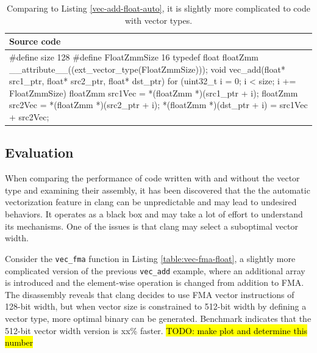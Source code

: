 \documentclass[logo,bsc,singlespacing,parskip]{infthesis}
\newenvironment{VerbatimCompact}
  {\vspace*{-2.5mm}\VerbatimEnvironment
   \par\Verbatim}
  {\endVerbatim\vspace*{-2.4mm}}
\begin{document}
\begin{table}[ht]\captionsetup{name=Listing}
\captionsetup{justification=centering}
\begin{tabular}{>{\raggedright\arraybackslash}p{14cm}}
    Source code\\
    \midrule
    \begin{VerbatimCompact}
#define size 128
#define FloatZmmSize 16
typedef float floatZmm __attribute__((ext_vector_type(FloatZmmSize)));
void vec_add(float* src1_ptr, float* src2_ptr, float* dst_ptr) {
    for (uint32_t i = 0; i < size; i += FloatZmmSize){
        floatZmm src1Vec = *(floatZmm *)(src1_ptr + i);
        floatZmm src2Vec = *(floatZmm *)(src2_ptr + i);
        *(floatZmm *)(dst_ptr + i) = src1Vec + src2Vec;
    }
}
\end{VerbatimCompact}
\end{tabular}
\caption{Comparing to Listing \ref{vec-add-float-auto}, it is slightly more
complicated to code with vector types.}
\label{vec-add-float-vecty}
\end{table}
\subsection{Evaluation}
When comparing the performance of code written with and without the vector type
and examining their assembly, it has been discovered that the the automatic
vectorization feature in clang can be unpredictable and may lead to undesired
behaviors. It operates as a black box and may take a lot of effort to understand
its mechanisms. One of the issues is that clang may select a suboptimal vector
width.

Consider the \texttt{vec\_fma} function in Listing
\ref{table:vec-fma-float}, a slightly
more complicated version of the previous \texttt{vec\_add} example, where an
additional array is introduced and the element-wise operation is changed from
addition to FMA. The disassembly reveals that clang decides to use FMA vector
instructions of 128-bit width, but when vector size is constrained to 512-bit
width by defining a vector type, more optimal binary can be generated. Benchmark
indicates that the 512-bit vector width version is xx\% faster.  
\hl{TODO: make plot and determine this number}


\end{document}
